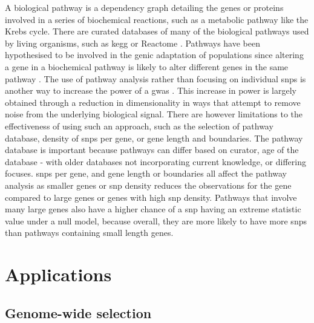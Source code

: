 \documentclass[]{report}
\begin{document}
A biological pathway is a dependency graph detailing the genes or
proteins involved in a series of biochemical reactions, such as a
metabolic pathway like the Krebs cycle. There are curated databases of
many of the biological pathways used by living organisms, such as
\gls{kegg} \citep{Kanehisa2017} or Reactome \citep{Fabregat2018}.
Pathways have been hypothesised to be involved in the genic adaptation
of populations since altering a gene in a biochemical pathway is likely
to alter different genes in the same pathway \citep{Bigham2010}. The use
of pathway analysis rather than focusing on individual \glspl{snp} is
another way to increase the power of a \gls{gwas} \citep{Jia2011}. This
increase in power is largely obtained through a reduction in
dimensionality in ways that attempt to remove noise from the underlying
biological signal. There are however limitations to the effectiveness of
using such an approach, such as the selection of pathway database,
density of \glspl{snp} per gene, or gene length and boundaries. The
pathway database is important because pathways can differ based on
curator, age of the database - with older databases not incorporating
current knowledge, or differing focuses. \Glspl{snp} per gene, and gene
length or boundaries all affect the pathway analysis as smaller genes or
\gls{snp} density reduces the observations for the gene compared to
large genes or genes with high \gls{snp} density. Pathways that involve
many large genes also have a higher chance of a \gls{snp} having an
extreme statistic value under a null model, because overall, they are
more likely to have more \glspl{snp} than pathways containing small
length genes.

\section{Applications}\label{applications}

\subsection{Genome-wide selection}\label{genome-wide-selection}
\end{document}
